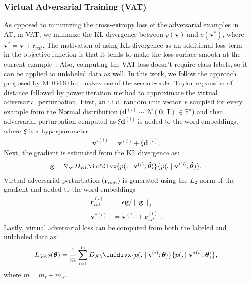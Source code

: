 \documentclass[letterpaper]{article}
\newcommand{\citep}{\cite}
\newcommand{\infdiv}{D_{\textit{KL}}\infdivx}
\begin{document}
\subsubsection{\textbf{Virtual Adversarial Training (VAT)}} 
As opposed to minimizing the cross-entropy loss of the adversarial examples in AT, in VAT, we minimize the KL divergence between $p(\mathbf{v})$ and $p(\mathbf{v}^*)$, where $\mathbf{v}^* = \mathbf{v} + \mathbf{r}_{\textit{vat}}$. The motivation of using KL divergence as an additional loss term in the objective function is that it tends to make the loss surface smooth at the current example~\citep{miyato2017virtual}. Also, computing the VAT loss doesn't require class labels, so it can be applied to unlabeled data as well. In this work, we follow the approach proposed by MDG16 that makes use of the second-order Taylor expansion of distance followed by power iteration method to approximate the virtual adversarial perturbation. First, an i.i.d. random unit vector is sampled for every example from the Normal distribution ($\mathbf{d}^{(i)}\sim\mathcal{N}(\mathbf{0},\:\mathbf{I})\in\mathbb{R}^d$) and then adversarial perturbation computed as $\xi \mathbf{d}^{(i)}$ is added to the word embeddings, where $\xi$ is a hyperparameter
\begin{align*}
\mathbf{v}'^{(i)} = \mathbf{v}^{(i)} + \xi\mathbf{d}^{(i)}.
\end{align*}
Next, the gradient is estimated from the KL divergence as:
\begin{align*}
\mathbf{g} = \nabla_{\mathbf{v'}}\infdiv
{p(. \mid \mathbf{v}^{(i)}; \boldsymbol{\hat{\theta}})}
{p(. \mid \mathbf{v}'^{(i)}; \boldsymbol{\hat{\theta}})}.
\end{align*}
Virtual adversarial perturbation ($\mathbf{r}_{\textit{vadv}}$) is generated using the $L_2$ norm of the gradient and added to the word embeddings
\begin{align*}
\mathbf{r}^{(i)}_{ \textit{vat} } &= \epsilon \mathbf{g}/\|\mathbf{g}\|_2\\
\mathbf{v}^{*(i)} &= \mathbf{v}^{(i)} + \mathbf{r}^{(i)}_{\textit{vat}}\;.
\end{align*}
Lastly, virtual adversarial loss can be computed from both the labeled and unlabeled data as:
\begin{align*}
L_{\textit{VAT}}(\boldsymbol{\theta}) = \frac{1}{m} \sum_{i=1}^{m} \infdiv{p(. \mid \mathbf{v}^{(i)};\boldsymbol{\theta})}{p(. \mid \mathbf{v}^{*(i)};\boldsymbol{\theta})},
\end{align*}
where $m = m_{\ell} + m_\textit{u}$.
\end{document}
